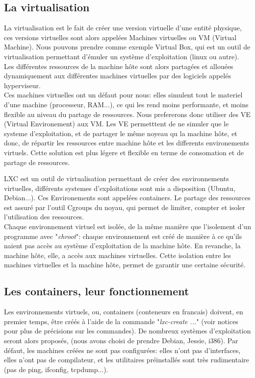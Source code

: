 \subsection{La virtualisation}
La virtualisation est le fait de cr\'eer une version virtuelle d'une entit\'e physique, ces versions virtuelles
sont alors appel\'ees Machines virtuelles ou VM (Virtual Machine). Nous 
pouvons prendre comme exemple Virtual Box, qui est un outil de virtualisation 
permettant d'\'emuler un syst\`eme d'exploitation (linux ou autre). Les diff\'erentes ressources de la machine 
h\^ote sont alors partag\'ees et allou\'ees dynamiquement aux diff\'erentes machines virtuelles par des logiciels
appel\'es hyperviseur.\\

Ces machines virtuelles ont un d\'efaut pour nous: elles simulent tout le materiel d'une machine (processeur, RAM...), ce qui les rend moins performante, et moins flexible au niveau du partage de ressources. Nous prefererons donc utiliser des VE (Virtual Environement) aux VM. Les VE permetttent de ne simuler que le systeme d'exploitation, et de partager le m\^eme noyeau qu la machine h\^ote, et donc, de r\'epartir les ressources entre machine h\^ote et les differents environements virtuels. Cette solution est plus l\'egere et flexible en terme de consomation et de partage de ressources.  

LXC est un outil de virtualisation permettant de cr\'eer des environnements virtuelles, diff\'erents systemes d'exploitations sont mis a disposition (Ubuntu, Debian...). Ces Environements sont appel\'ees containers. Le partage des ressources est assur\'e par l'outil Cgroups du noyau, qui permet de limiter, compter et isoler l'utilisation des ressources.\\

Chaque environnement virtuel est isol\'ee, de la m\^eme mani\`ere que l'isolement d'un programme 
avec "\emph{chroot}": chaque environnement est cr\'e\'e de mani\`ere \`a ce qu'ils naient pas acc\`es au syst\`eme 
d'exploitation de la machine h\^ote. En revanche, la machine h\^ote, elle, a acc\`es aux machines virtuelles.
Cette isolation entre les machines virtuelles et la machine h\^ote, permet de garantir une certaine s\'ecurit\'e.\\


\subsection{Les containers, leur fonctionnement}
Les environnements virtuels, ou, containers (conteneurs en francais)  doivent, en premier temps, \^etre cr\'e\'es
\`a l'aide de la commande "\emph{lxc-create ...}" (voir notices pour plus de pr\'ecisions sur les commandes). De
nombreux syst\`emes d'exploitation seront alors propos\'es, (nous avons choisi de prendre Debian, Jessie,
i386). Par d\'efaut, les machines cr\'e\'ees ne sont pas configur\'ees: elles n'ont pas d'interfaces, elles 
n'ont pas de compilateur, et les utilitaires pr\'einstall\'es sont tr\`es rudimentaire (pas de ping, ifconfig, tcpdump...).\\

